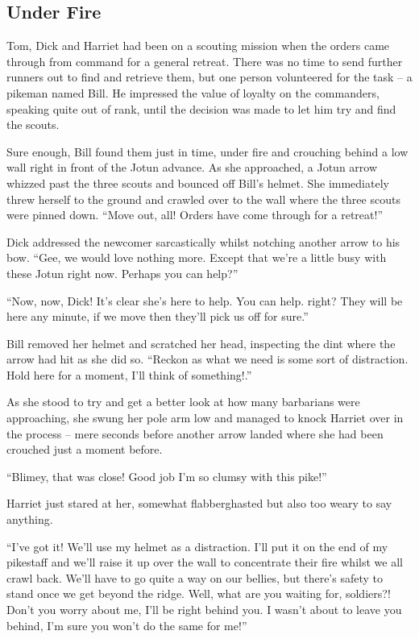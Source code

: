 \subsection{Under Fire}
Tom, Dick and Harriet had been on a scouting mission when the orders came through from command for a general retreat. There was no time to send further runners out to find and retrieve them, but one person volunteered for the task – a pikeman named Bill. He impressed the value of loyalty on the commanders, speaking quite out of rank, until the decision was made to let him try and find the scouts.

Sure enough, Bill found them just in time, under fire and crouching behind a low wall right in front of the Jotun advance. As she approached, a Jotun arrow whizzed past the three scouts and bounced off Bill's helmet. She immediately threw herself to the ground and crawled over to the wall where the three scouts were pinned down. “Move out, all! Orders have come through for a retreat!”

Dick addressed the newcomer sarcastically whilst notching another arrow to his bow. “Gee, we would love nothing more. Except that we're a little busy with these Jotun right now. Perhaps you can help?”

“Now, now, Dick! It's clear she's here to help. You can help. right? They will be here any minute, if we move then they'll pick us off for sure.”

Bill removed her helmet and scratched her head, inspecting the dint where the arrow had hit as she did so. “Reckon as what we need is some sort of distraction. Hold here for a moment, I'll think of something!.”

As she stood to try and get a better look at how many barbarians were approaching, she swung her pole arm low and managed to knock Harriet over in the process – mere seconds before another arrow landed where she had been crouched just a moment before.

“Blimey, that was close! Good job I'm so clumsy with this pike!”

Harriet just stared at her, somewhat flabberghasted but also too weary to say anything.

“I've got it! We'll use my helmet as a distraction. I'll put it on the end of my pikestaff and we'll raise it up over the wall to concentrate their fire whilst we all crawl back. We'll have to go quite a way on our bellies, but there's safety to stand once we get beyond the ridge. Well, what are you waiting for, soldiers?! Don't you worry about me, I'll be right behind you. I wasn't about to leave you behind, I'm sure you won't do the same for me!”

